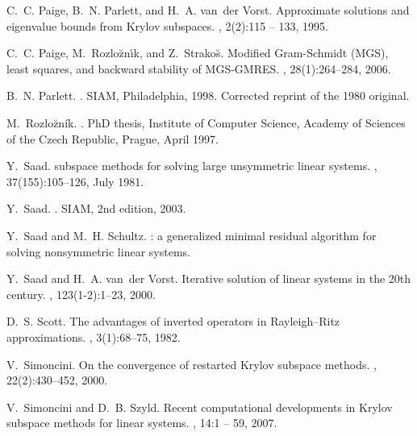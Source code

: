 \documentclass{report}
\begin{document}
\begin{thebibliography}{100}
   C.~C. Paige, B.~N. Parlett, and H.~A. van~der Vorst. \newblock Approximate
  solutions and eigenvalue bounds from {Krylov} subspaces. , 2(2):115 -- 133,
1995.

 C.~C. Paige, M.~Rozlo{\u{z}}n{\'{\i}}k, and Z.~Strako{\u{s}}. \newblock
  Modified {G}ram-{S}chmidt ({MGS}), least squares, and backward
stability of {MGS-GMRES}.
,
28(1):264--284, 2006.


	
	 B.~N. Parlett. . \newblock SIAM,
	Philadelphia, 1998. \newblock Corrected reprint of the 1980 original.

 M.~Rozlo\u{z}ník. .
    \newblock PhD thesis, Institute of Computer Science, Academy of Sciences of the
  Czech Republic, Prague, April 1997.


 Y.~Saad.  subspace methods for solving large unsymmetric linear
  systems.
, 37(155):105--126, July 1981.

	 Y.~Saad. . \newblock SIAM,
	2nd edition, 2003.
	
	 Y.~Saad and M.~H. Schultz. : a generalized minimal residual
    algorithm for solving
  nonsymmetric linear systems.

   Y.~Saad and H.~A. van~der Vorst. \newblock Iterative solution of linear systems in
    the 20th century. ,
  123(1-2):1--23, 2000.



	
	 D.~S. Scott. \newblock The advantages of inverted operators in {Rayleigh--Ritz}
	approximations.
	,
	3(1):68--75, 1982.
		
	 V.~Simoncini. \newblock On the convergence of restarted {Krylov} subspace
    methods. ,
  22(2):430--452, 2000.

 
     V.~Simoncini and D.~B. Szyld. \newblock Recent computational developments in
    {Krylov} subspace methods for
  linear systems.
, 14:1 -- 59, 2007.


\end{thebibliography}
\end{document}
